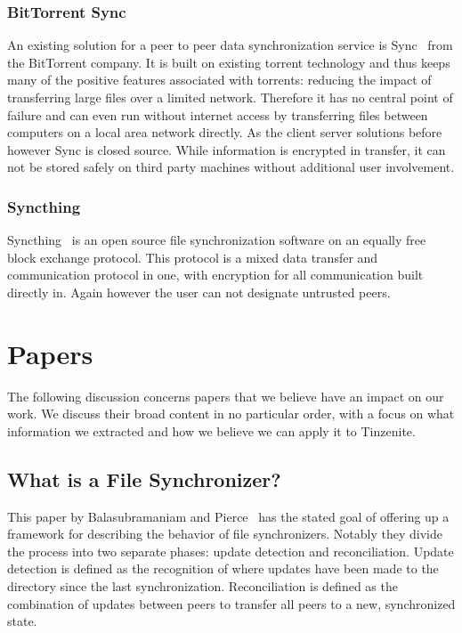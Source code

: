\subsubsection{BitTorrent Sync}
\label{subs:BitTorrent Sync}

An existing solution for a peer to peer data synchronization service is Sync~\cite{web:site:bittorrent_sync} from the BitTorrent company.
It is built on existing torrent technology and thus keeps many of the positive features associated with torrents: reducing the impact of transferring large files over a limited network.
Therefore it has no central point of failure and can even run without internet access by transferring files between computers on a local area network directly.
As the client server solutions before however Sync is closed source.
While information is encrypted in transfer, it can not be stored safely on third party machines without additional user involvement.

\subsubsection{Syncthing}
\label{subs:Syncthing}

Syncthing~\cite{web:site:synthing} is an open source file synchronization software on an equally free block exchange protocol.
This protocol is a mixed data transfer and communication protocol in one, with encryption for all communication built directly in.
Again however the user can not designate untrusted peers.

\section{Papers}
\label{sec:Papers}

The following discussion concerns papers that we believe have an impact on our work.
We discuss their broad content in no particular order, with a focus on what information we extracted and how we believe we can apply it to Tinzenite.

\subsection{What is a File Synchronizer?}
\label{sub:What is a File Synchronizer?}

This paper by Balasubramaniam and Pierce~\cite{balasubramaniam1998file} has the stated goal of offering up a framework for describing the behavior of file synchronizers.
Notably they divide the process into two separate phases: update detection and reconciliation.
Update detection is defined as the recognition of where updates have been made to the directory since the last synchronization.
Reconciliation is defined as the combination of updates between peers to transfer all peers to a new, synchronized state.

